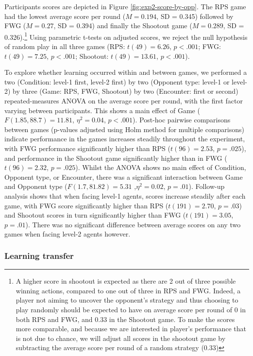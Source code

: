 \documentclass[
  english,
  man,floatsintext]{apa6}
\begin{document}
Participants scores are depicted in Figure \ref{fig:exp2-score-by-opp}. The RPS game had the lowest average score per round (\(M = 0.194\), SD = 0.345) followed by FWG (\(M = 0.27\), SD = 0.394) and finally the Shootout game (\(M = 0.289\), SD = 0.326).\footnote{ A higher score in shootout is expected as there are 2 out of three possible winning actions, compared to one out of three in RPS and FWG. Indeed, a player not aiming to uncover the opponent's strategy and thus choosing to play randomly should be expected to have on average score per round of 0 in both RPS and FWG, and 0.33 in the Shootout game. To make the scores more comparable, and because we are interested in player's performance that is not due to chance, we will adjust all scores in the shootout game by subtracting the average score per round of a random strategy (0.33)} Using parametric t-tests on adjusted scores, we reject the null hypothesis of random play in all three games (RPS: \(t(49) = 6.26\), \(p < .001\); FWG: \(t(49) = 7.25\), \(p < .001\); Shootout: \(t(49) = 13.61\), \(p < .001\)).

To explore whether learning occurred within and between games, we performed a two (Condition: level-1 first, level-2 first) by two (Opponent type: level-1 or level-2) by three (Game: RPS, FWG, Shootout) by two (Encounter: first or second) repeated-measures ANOVA on the average score per round, with the first factor varying between participants. This shows a main effect of Game (\(F(1.85,88.7) = 11.81\), \(\eta^{2} = 0.04\), \(p < .001\)). Post-hoc pairwise comparisons between games (p-values adjusted using Holm method for multiple comparisons) indicate performance in the games increases steadily throughout the experiment, with FWG performance significantly higher than RPS (\(t(96) =2.53\), \(p = .025\)), and performance in the Shootout game significantly higher than in FWG (\(t(96) = 2.32\), \(p = .025\)). Whilst the ANOVA shows no main effect of Condition, Opponent type, or Encounter, there was a significant interaction between Game and Opponent type (\(F(1.7, 81.82) = 5.31\) ,\(\eta^{2} = 0.02\), \(p = .01\)). Follow-up analysis shows that when facing level-1 agents, scores increase steadily after each game, with FWG score significantly higher than RPS (\(t(191) = 2.70\), \(p = .03\)) and Shootout scores in turn significantly higher than FWG (\(t(191) = 3.05\), \(p = .01\)). There was no significant difference between average scores on any two games when facing level-2 agents however.

\hypertarget{learning-transfer-1}{%
\subsubsection{Learning transfer}\label{learning-transfer-1}}
\end{document}
